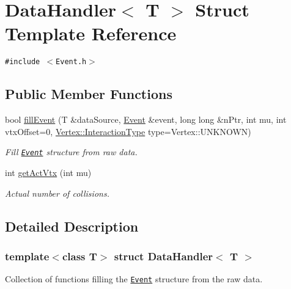 \hypertarget{structDataHandler}{
\section{Data\-Handler$<$ T $>$ Struct Template Reference}
\label{structDataHandler}
}
{\tt \#include $<$Event.h$>$}

\subsection*{Public Member Functions}
\begin{CompactItemize}
\item 
bool \hyperlink{structDataHandler_be7affae244cf17f9ef93b2d1216ce6d}{fill\-Event} (T \&data\-Source, \hyperlink{classEvent}{Event} \&event, long long \&n\-Ptr, int mu, int vtx\-Offset=0, \hyperlink{classVertex_0d80a5c5ed3bd9be72a325aa448eca25}{Vertex::Interaction\-Type} type=Vertex::UNKNOWN)
\begin{CompactList}\small\item\em Fill {\tt \hyperlink{classEvent}{Event}} structure from raw data. \item\end{CompactList}\item 
int \hyperlink{structDataHandler_4efc749da9cab2099a6ad1ca60146246}{get\-Act\-Vtx} (int mu)
\begin{CompactList}\small\item\em Actual number of collisions. \item\end{CompactList}\end{CompactItemize}


\subsection{Detailed Description}
\subsubsection*{template$<$class T$>$ struct Data\-Handler$<$ T $>$}

Collection of functions filling the {\tt \hyperlink{classEvent}{Event}} structure from the raw data. 



